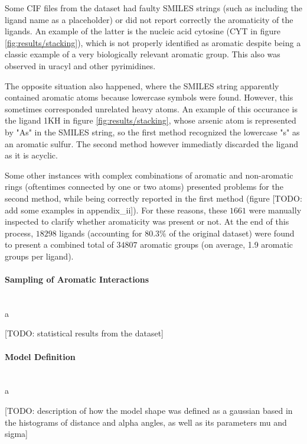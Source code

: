       Some CIF files from the dataset had faulty SMILES strings (such as including the ligand name as a placeholder) or did not report correctly the aromaticity of the ligands. An example of the latter is the nucleic acid cytosine (CYT in figure \ref{fig:results/stacking}), which is not properly identified as aromatic despite being a classic example of a very biologically relevant aromatic group. This also was observed in uracyl and other pyrimidines.


      The opposite situation also happened, where the SMILES string apparently contained aromatic atoms because lowercase symbols were found. However, this sometimes corresponded unrelated heavy atoms. An example of this occurance is the ligand 1KH in figure \ref{fig:results/stacking}, whose arsenic atom is represented by "As" in the SMILES string, so the first method recognized the lowercase "s" as an aromatic sulfur. The second method however immediatly discarded the ligand as it is acyclic.

      Some other instances with complex combinations of aromatic and non-aromatic rings (oftentimes connected by one or two atoms) presented problems for the second method, while being correctly reported in the first method (figure [TODO: add some examples in appendix\_ii]). For these reasons, these $1661$ were manually inspected to clarify whether aromaticity was present or not. At the end of this process, $18298$ ligands (accounting for $80.3 \% $ of the original dataset) were found to present a combined total of $34807$ aromatic groups (on average, 1.9 aromatic groups per ligand).

    \paragraph*{Sampling of Aromatic Interactions}\mbox{}\\
      a

      [TODO: statistical results from the dataset]

    \paragraph*{Model Definition}\mbox{}\\
      a

      [TODO: description of how the model shape was defined as a gaussian based in the histograms of distance and alpha angles, as well as its parameters mu and sigma]

